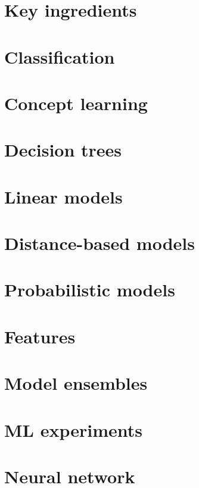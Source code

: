 \documentclass[8pt]{extarticle} %
\begin{document}
\tiny
\raggedright
\begin{multicols}{3}
\section{Key ingredients}

\section{Classification}

\section{Concept learning}

\section{Decision trees}

\section{Linear models}

\section{Distance-based models}

\section{Probabilistic models}

\section{Features}

\section{Model ensembles}

\section{ML experiments}

\section{Neural network}

\end{multicols}
\end{document}
